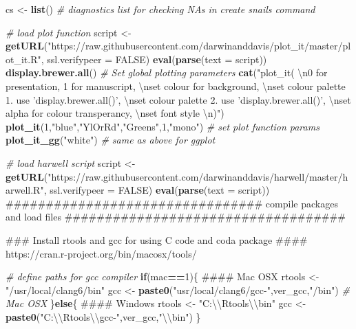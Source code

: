 \documentclass[10,portrait]{article}
\newenvironment{Shaded}{\begin{snugshade}}{\end{snugshade}}
\newcommand{\KeywordTok}[1]{\textcolor[rgb]{0.13,0.29,0.53}{\textbf{#1}}}
\newcommand{\DataTypeTok}[1]{\textcolor[rgb]{0.13,0.29,0.53}{#1}}
\newcommand{\DecValTok}[1]{\textcolor[rgb]{0.00,0.00,0.81}{#1}}
\newcommand{\CharTok}[1]{\textcolor[rgb]{0.31,0.60,0.02}{#1}}
\newcommand{\StringTok}[1]{\textcolor[rgb]{0.31,0.60,0.02}{#1}}
\newcommand{\CommentTok}[1]{\textcolor[rgb]{0.56,0.35,0.01}{\textit{#1}}}
\newcommand{\OtherTok}[1]{\textcolor[rgb]{0.56,0.35,0.01}{#1}}
\newcommand{\ControlFlowTok}[1]{\textcolor[rgb]{0.13,0.29,0.53}{\textbf{#1}}}
\newcommand{\OperatorTok}[1]{\textcolor[rgb]{0.81,0.36,0.00}{\textbf{#1}}}
\newcommand{\NormalTok}[1]{#1}
\begin{document}
\begin{Shaded}
\begin{Highlighting}[]
\NormalTok{cs <-}\StringTok{ }\KeywordTok{list}\NormalTok{() }\CommentTok{# diagnostics list for checking NAs in create snails command  }

\CommentTok{# load plot function }
\NormalTok{script <-}\StringTok{ }\KeywordTok{getURL}\NormalTok{(}\StringTok{"https://raw.githubusercontent.com/darwinanddavis/plot_it/master/plot_it.R"}\NormalTok{, }\DataTypeTok{ssl.verifypeer =} \OtherTok{FALSE}\NormalTok{)}
\KeywordTok{eval}\NormalTok{(}\KeywordTok{parse}\NormalTok{(}\DataTypeTok{text =}\NormalTok{ script))}
\KeywordTok{display.brewer.all}\NormalTok{()}
\CommentTok{# Set global plotting parameters}
\KeywordTok{cat}\NormalTok{(}\StringTok{"plot_it( }\CharTok{\textbackslash{}n}\StringTok{0 for presentation, 1 for manuscript, }\CharTok{\textbackslash{}n}\StringTok{set colour for background, }\CharTok{\textbackslash{}n}\StringTok{set colour palette 1. use 'display.brewer.all()', }\CharTok{\textbackslash{}n}\StringTok{set colour palette 2. use 'display.brewer.all()', }\CharTok{\textbackslash{}n}\StringTok{set alpha for colour transperancy, }\CharTok{\textbackslash{}n}\StringTok{set font style }\CharTok{\textbackslash{}n}\StringTok{)"}\NormalTok{)}
\KeywordTok{plot_it}\NormalTok{(}\DecValTok{1}\NormalTok{,}\StringTok{"blue"}\NormalTok{,}\StringTok{"YlOrRd"}\NormalTok{,}\StringTok{"Greens"}\NormalTok{,}\DecValTok{1}\NormalTok{,}\StringTok{"mono"}\NormalTok{) }\CommentTok{# set plot function params       }
\KeywordTok{plot_it_gg}\NormalTok{(}\StringTok{"white"}\NormalTok{) }\CommentTok{# same as above for ggplot     }

\CommentTok{# load harwell script}
\NormalTok{script <-}\StringTok{ }\KeywordTok{getURL}\NormalTok{(}\StringTok{"https://raw.githubusercontent.com/darwinanddavis/harwell/master/harwell.R"}\NormalTok{, }\DataTypeTok{ssl.verifypeer =} \OtherTok{FALSE}\NormalTok{)}
\KeywordTok{eval}\NormalTok{(}\KeywordTok{parse}\NormalTok{(}\DataTypeTok{text =}\NormalTok{ script))}
\NormalTok{################################  compile packages and load files ###################################}

\NormalTok{### Install rtools and gcc for using C code and coda package }
\NormalTok{#### https://cran.r-project.org/bin/macosx/tools/}

\CommentTok{# define paths for gcc compiler }
\ControlFlowTok{if}\NormalTok{(mac}\OperatorTok{==}\DecValTok{1}\NormalTok{)\{ #### Mac OSX}
\NormalTok{  rtools <-}\StringTok{ "/usr/local/clang6/bin"}
\NormalTok{  gcc <-}\StringTok{ }\KeywordTok{paste0}\NormalTok{(}\StringTok{"usr/local/clang6/gcc-"}\NormalTok{,ver_gcc,}\StringTok{"/bin"}\NormalTok{)}
  \CommentTok{# Mac OSX}
\NormalTok{\}}\ControlFlowTok{else}\NormalTok{\{ #### Windows }
\NormalTok{  rtools <-}\StringTok{ "C:}\CharTok{\textbackslash{}\textbackslash{}}\StringTok{Rtools}\CharTok{\textbackslash{}\textbackslash{}}\StringTok{bin"}
\NormalTok{  gcc <-}\StringTok{ }\KeywordTok{paste0}\NormalTok{(}\StringTok{"C:}\CharTok{\textbackslash{}\textbackslash{}}\StringTok{Rtools}\CharTok{\textbackslash{}\textbackslash{}}\StringTok{gcc-"}\NormalTok{,ver_gcc,}\StringTok{"}\CharTok{\textbackslash{}\textbackslash{}}\StringTok{bin"}\NormalTok{)}
\NormalTok{\}}


\end{Highlighting}
\end{Shaded}
\end{document}
